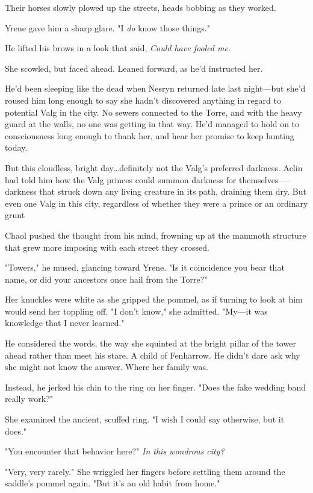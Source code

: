 Their horses slowly plowed up the streets, heads bobbing as they worked.

Yrene gave him a sharp glare.
"I \emph{do} know those things."

He lifted his brows in a look that said, \emph{Could have fooled me}.

She scowled, but faced ahead.
Leaned forward, as he'd instructed her.

He'd been sleeping like the dead when Nesryn returned late last night---but she'd roused him long enough to say she hadn't discovered anything in regard to potential Valg in the city.
No sewers connected to the Torre, and with the heavy guard at the walls, no one was getting in that way.
He'd managed to hold on to consciousness long enough to thank her, and hear her promise to keep hunting today.

But this cloudless, bright day\ldots definitely not the Valg's preferred darkness.
Aelin had told him how the Valg princes could summon darkness for themselves ---darkness that struck down any living creature in its path, draining them dry.
But even one Valg in this city, regardless of whether they were a prince or an ordinary grunt 

Chaol pushed the thought from his mind, frowning up at the mammoth structure that grew more imposing with each street they crossed.

"Towers," he mused, glancing toward Yrene.
"Is it coincidence you bear that name, or did your ancestors once hail from the Torre?"

Her knuckles were white as she gripped the pommel, as if turning to look at him would send her toppling off.
"I don't know," she admitted.
"My---it was knowledge that I never learned."

He considered the words, the way she squinted at the bright pillar of the tower ahead rather than meet his stare.
A child of Fenharrow.
He didn't dare ask why she might not know the answer.
Where her family was.

Instead, he jerked his chin to the ring on her finger.
"Does the fake wedding band really work?"

She examined the ancient, scuffed ring.
"I wish I could say otherwise, but it does."

"You encounter that behavior here?"
\emph{In this wondrous city?}

"Very, very rarely."
She wriggled her fingers before settling them around the saddle's pommel again.
"But it's an old habit from home."

